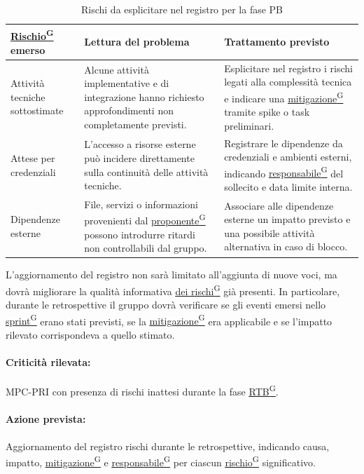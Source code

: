 \documentclass[a4paper,12pt]{article}
\providecommand{\glslink}[2]{\href{https://alittlebyte-19.github.io/Documentazione/glossario.html\#gls-#1}{\underline{#2}\textsuperscript{\scriptsize G}}}
\begin{document}
\begin{table}[H]
    \centering
    \renewcommand{\arraystretch}{1.25}
    \begin{tabularx}{\textwidth}{|p{3.2cm}|X|X|}
        \hline
        \rowcolor{gray!35}
        \textbf{\glslink{rischio}{Rischio} emerso} & \textbf{Lettura del problema} & \textbf{Trattamento previsto} \\
        \hline
        Attività tecniche sottostimate & Alcune attività implementative e di integrazione hanno richiesto approfondimenti non completamente previsti. & Esplicitare nel registro i rischi legati alla complessità tecnica e indicare una \glslink{mitigazione-dei-rischi}{mitigazione} tramite spike o task preliminari. \\
        \hline
        Attese per credenziali & L'accesso a risorse esterne può incidere direttamente sulla continuità delle attività tecniche. & Registrare le dipendenze da credenziali e ambienti esterni, indicando \glslink{responsabile}{responsabile} del sollecito e data limite interna. \\
        \hline
        Dipendenze esterne & File, servizi o informazioni provenienti dal \glslink{committente-proponente}{proponente} possono introdurre ritardi non controllabili dal gruppo. & Associare alle dipendenze esterne un impatto previsto e una possibile attività alternativa in caso di blocco. \\
        \hline
    \end{tabularx}
    \caption{Rischi da esplicitare nel registro per la fase PB}
\end{table}

L'aggiornamento del registro non sarà limitato all'aggiunta di nuove voci, ma dovrà migliorare la qualità informativa \glslink{mitigazione-dei-rischi}{dei rischi} già presenti. In particolare, durante le retrospettive il gruppo dovrà verificare se gli eventi emersi nello \glslink{sprint}{sprint} erano stati previsti, se la \glslink{mitigazione-dei-rischi}{mitigazione} era applicabile e se l'impatto rilevato corrispondeva a quello stimato.

\paragraph*{Criticità rilevata:} MPC-PRI con presenza di rischi inattesi durante la fase \glslink{rtb-requirements-and-technology-baseline}{RTB}.

\paragraph*{Azione prevista:} Aggiornamento del registro rischi durante le retrospettive, indicando causa, impatto, \glslink{mitigazione-dei-rischi}{mitigazione} e \glslink{responsabile}{responsabile} per ciascun \glslink{rischio}{rischio} significativo.
\end{document}
